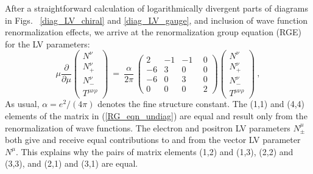 \documentclass[12pt]{revtex4}
\begin{document}
After a straightforward calculation of logarithmically divergent parts
of diagrams in Figs. ~\ref{diag_LV_chiral} and \ref{diag_LV_gauge},
and inclusion of wave function renormalization effects, we arrive at
the renormalization group equation (RGE) for the LV parameters: 
\begin{equation}
\label{RG_eqn_undiag}
     \mu \frac{\partial}
              {\partial\mu} 
                \left(
\begin{array}{c}
                   N^\nu \\ 
   N_+^\nu \\
                   N_{-}^\nu \\
   T^{\mu\nu\rho}
                \end{array} \right) ~=~  
     \frac{\alpha}
          {2 \pi} \, 
     \left(\begin{array}{rrrr}
                    2 & -1 & -1 & ~~0 \\
   -6 &  3 &  0 & ~~0 \\
                   -6 &  0 &  3 & ~~0 \\
    0 &  0 &  0 & ~~2
           \end{array}\right)
     \left(
  \begin{array}{c}
                 N^\nu \\ 
 N_+^\nu \\
                 N_{-}^\nu \\
 T^{\mu\nu\rho}
          \end{array} \right)~,
\end{equation}
%
As usual, $\alpha = e^2/(4\pi)$ denotes the fine structure constant. 
The (1,1) and (4,4) elements of the matrix in (\ref{RG_eqn_undiag})
are equal and  result only from the renormalization of wave functions.
The electron and positron LV parameters $N_\pm^\mu$ both give and
receive equal contributions to and from the vector LV parameter
$N^\mu$. This explains why the pairs of matrix elements (1,2) and (1,3),
(2,2) and (3,3), and (2,1) and (3,1) are equal.  
\end{document}
